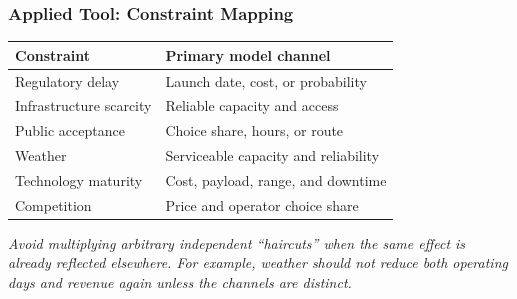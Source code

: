 \documentclass{beamer}
\begin{document}
\begin{frame}[t]
\frametitle{Applied Tool: Constraint Mapping}
\begin{center}\small
\begin{tabular}{l|l}
\textbf{Constraint} & \textbf{Primary model channel}\\
\hline
Regulatory delay & Launch date, cost, or probability\\
Infrastructure scarcity & Reliable capacity and access\\
Public acceptance & Choice share, hours, or route\\
Weather & Serviceable capacity and reliability\\
Technology maturity & Cost, payload, range, and downtime\\
Competition & Price and operator choice share\\
\end{tabular}
\end{center}
\vspace{0.3cm}
\textit{Avoid multiplying arbitrary independent ``haircuts'' when the same effect is already reflected elsewhere. For example, weather should not reduce both operating days and revenue again unless the channels are distinct.}
\end{frame}
\end{document}
